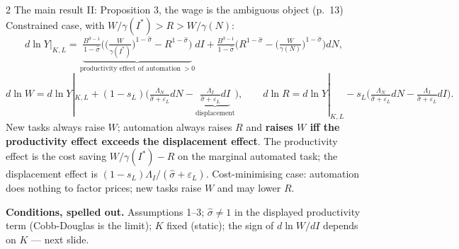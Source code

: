 \documentclass[aspectratio=169,11pt]{beamer}
\begin{document}
\begin{frame}{2 \textperiodcentered{} The main result II: Proposition 3, the wage is the ambiguous object (p.\ 13)}
  \footnotesize
  Constrained case, with $W/\gamma(I^*)>R>W/\gamma(N)$:
  \[
    d\ln Y|_{K,L}=\underbrace{\tfrac{B^{\hat\sigma-1}}{1-\hat\sigma}\Big(\big(\tfrac{W}{\gamma(I^*)}\big)^{1-\hat\sigma}-R^{1-\hat\sigma}\Big)}_{\text{productivity effect of automation}\ >0}dI
    +\tfrac{B^{\hat\sigma-1}}{1-\hat\sigma}\Big(R^{1-\hat\sigma}-\big(\tfrac{W}{\gamma(N)}\big)^{1-\hat\sigma}\Big)dN,
  \]
  \[
    d\ln W=d\ln Y|_{K,L}+(1-s_L)\Big(\tfrac{\Lambda_N}{\hat\sigma+\varepsilon_L}dN-\underbrace{\tfrac{\Lambda_I}{\hat\sigma+\varepsilon_L}dI}_{\text{displacement}}\Big),\qquad
    d\ln R=d\ln Y|_{K,L}-s_L\Big(\tfrac{\Lambda_N}{\hat\sigma+\varepsilon_L}dN-\tfrac{\Lambda_I}{\hat\sigma+\varepsilon_L}dI\Big).
  \]
  New tasks always raise $W$; automation always raises $R$ and \textbf{raises $W$ iff the productivity effect
  exceeds the displacement effect}. The productivity effect is the cost saving $W/\gamma(I^*)-R$ on the
  marginal automated task; the displacement effect is $(1-s_L)\Lambda_I/(\hat\sigma+\varepsilon_L)$.
  Cost-minimising case: automation does nothing to factor prices; new tasks raise $W$ and may lower $R$.

  \smallskip
  \textbf{Conditions, spelled out.} Assumptions 1--3; $\hat\sigma\neq1$ in the displayed productivity term
  (Cobb-Douglas is the limit); $K$ fixed (static); the sign of $d\ln W/dI$ depends on $K$ --- next slide.
\end{frame}
\end{document}
